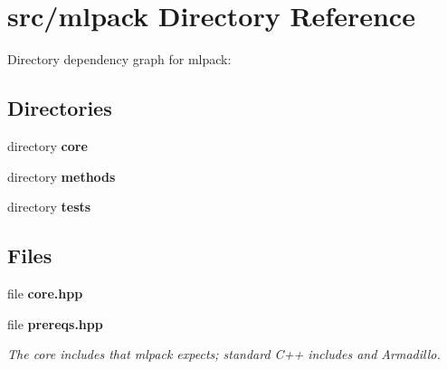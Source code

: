 \section{src/mlpack Directory Reference}
\label{dir_6eb49727f7e0b689ddabdbdfc4e541ff}
Directory dependency graph for mlpack\-:
\subsection*{Directories}
\begin{DoxyCompactItemize}
\item 
directory {\bf core}
\item 
directory {\bf methods}
\item 
directory {\bf tests}
\end{DoxyCompactItemize}
\subsection*{Files}
\begin{DoxyCompactItemize}
\item 
file {\bf core.\-hpp}
\item 
file {\bf prereqs.\-hpp}
\begin{DoxyCompactList}\small\item\em The core includes that mlpack expects; standard C++ includes and Armadillo. \end{DoxyCompactList}\end{DoxyCompactItemize}
